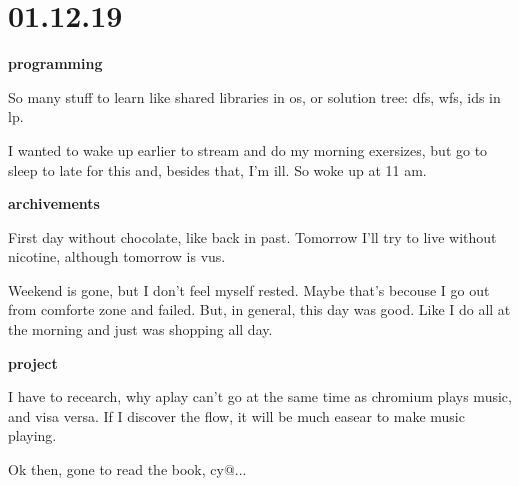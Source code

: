 \documentclass[12pt,a4paper,titlepage]{article}
\begin{document}
\newpage
\section{01.12.19}
\begin{center}
  \textbf{programming}
\end{center}
So many stuff to learn like shared libraries in os, or solution tree:
dfs, wfs, ids in lp.
\par I wanted to wake up earlier to stream and do my morning exersizes,
but go to sleep to late for this and, besides that, I'm ill. So woke up
at 11 am.

\begin{center}
  \textbf{archivements}
\end{center}
First day without chocolate, like back in past. Tomorrow I'll try to live
without nicotine, although tomorrow is vus.
\par Weekend is gone, but I don't feel myself rested. Maybe that's
becouse I go out from comforte zone and failed. But, in general, this
day was good. Like I do all at the morning and just was shopping all
day.

\begin{center}
  \textbf{project}
\end{center}
I have to recearch, why aplay can't go at the same time as chromium
plays music, and visa versa. If I discover the flow, it will be much
easear to make music playing.
\par Ok then, gone to read the book, cy@...
\end{document}
